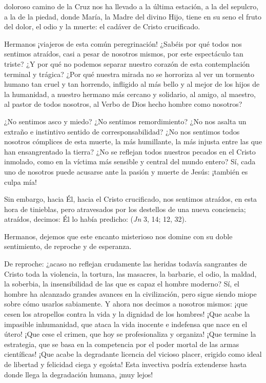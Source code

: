 
\begin{body}
 doloroso camino de la Cruz nos ha llevado a la última estación, a la del sepulcro, a la de la piedad, donde María, la Madre del divino Hijo, tiene en su seno el fruto del dolor, el odio y la muerte: el cadáver de Cristo crucificado. 

Hermanos ¡viajeros de esta común peregrinación! ¿Sabéis por qué todos nos sentimos atraídos, casi a pesar de nosotros mismos, por este espectáculo tan triste? ¿Y por qué no podemos separar nuestro corazón de esta contemplación terminal y trágica? ¿Por qué nuestra mirada no se horroriza al ver un tormento humano tan cruel y tan horrendo, infligido al más bello y al mejor de los hijos de la humanidad, a nuestro hermano más cercano y solidario, al amigo, al maestro, al pastor de todos nosotros, al Verbo de Dios hecho hombre como nosotros? 

¿No sentimos asco y miedo? ¿No sentimos remordimiento? ¿No nos asalta un extraño e instintivo sentido de corresponsabilidad? ¿No nos sentimos todos nosotros cómplices de esta muerte, la más humillante, la más injusta entre las que han ensangrentado la tierra? ¿No se reflejan todos nuestros pecados en el Cristo inmolado, como en la víctima más sensible y central del mundo entero? Sí, cada uno de nosotros puede acusarse ante la pasión y muerte de Jesús: ¡también es culpa mía! 

Sin embargo, hacia Él, hacia el Cristo crucificado, nos sentimos atraídos, en esta hora de tinieblas, pero atravesados por los destellos de una nueva conciencia; atraídos, decimos: Él lo había predicho:  (\textit{Jn} 3, 14; 12, 32).

Hermanos, dejemos que este encanto misterioso nos domine con su doble sentimiento, de reproche y de esperanza. 

De reproche: ¿acaso no reflejan crudamente las heridas todavía sangrantes de Cristo toda la violencia, la tortura, las masacres, la barbarie, el odio, la maldad, la soberbia, la insensibilidad de las que es capaz el hombre moderno? Sí, el hombre ha alcanzado grandes avances en la civilización, pero sigue siendo miope sobre cómo usarlos sabiamente. Y ahora nos decimos a nosotros mismos: ¡que cesen los atropellos contra la vida y la dignidad de los hombres! ¡Que acabe la impasible inhumanidad, que ataca la vida inocente e indefensa que nace en el útero! ¡Que cese el crimen, que hoy se profesionaliza y organiza! ¡Que termine la estrategia, que se basa en la competencia por el poder mortal de las armas científicas! ¡Que acabe la degradante licencia del vicioso placer, erigido como ideal de libertad y felicidad ciega y egoísta! Esta invectiva podría extenderse hasta donde llega la degradación humana, ¡muy lejos! 


\end{body}
